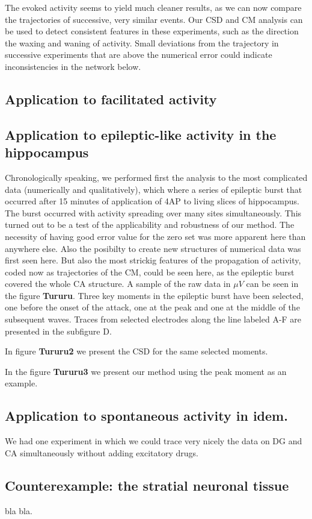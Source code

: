\documentclass[12pt]{article}
\begin{document}
The evoked activity seems to yield much cleaner results, as we can now compare the trajectories of successive, very similar events. Our CSD and CM analysis can be used to detect consistent features in these experiments, such as the direction the waxing and waning of activity. Small deviations from the trajectory in successive experiments that are above the numerical error could indicate inconsistencies in the network below. 

\subsection{Application to facilitated activity}


\subsection{Application to epileptic-like activity in the hippocampus}
Chronologically speaking, we performed first the analysis to the most complicated data (numerically and qualitatively), which where a series of epileptic burst that occurred after 15 minutes of application of 4AP to living slices of hippocampus. The burst occurred with activity spreading over many sites simultaneously. This turned out to be a test of the applicability and robustness of our method. The necessity of having good error value for the zero set was more apparent here than anywhere else. Also the posibilty to create new structures of numerical data was first seen here.  But also the most strickig features of the propagation of activity, coded now as trajectories of the CM, could be seen here, as the epileptic burst covered the whole CA structure. A sample of the raw data in $\mu V$ can be seen in the figure \textbf{Tururu}. Three key moments in the epileptic burst have been selected, one before the onset of the attack, one at the peak and one at the middle of the subsequent waves. Traces from selected electrodes along the line labeled A-F are presented in the subfigure D. 

In figure \textbf{Tururu2} we present the CSD for the same selected moments.

In the figure \textbf{Tururu3} we present our method using the peak moment as an example. 

\subsection{Application to spontaneous activity in idem.}

We had one experiment in which we could trace very nicely the data on DG and CA simultaneously without adding excitatory drugs. 

\subsection{Counterexample: the stratial neuronal tissue}

bla bla.


 
\end{document}
